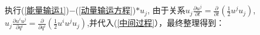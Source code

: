 \documentclass[LBMDerivation.tex]{subfiles}
\begin{document}


%


执行(\ref{能量输运1})$-$(\ref{动量输运方程})$*u_j$, 由于关系$u_j\frac{\partial u^j}{\partial t}=\frac{\partial}{\partial t}( \frac{1}{2}u^ju_j)$,$u_j\frac{\partial u^i u^j}{\partial q^i}=\frac{\partial}{\partial q^i}( \frac{1}{2}u^i u^ju_j)$,并代入(\ref{中间过程}），最终整理得到：







\end{document}
